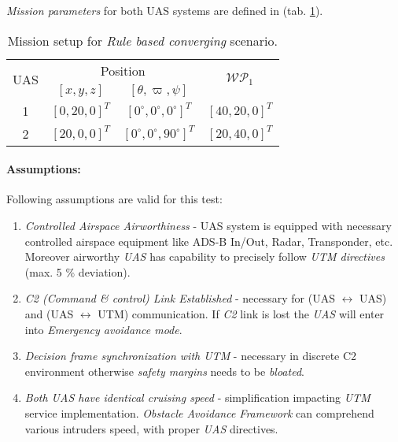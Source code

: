 \noindent\emph{Mission parameters} for both UAS systems are defined in (tab. \ref{tab:missionSetupRuleBasedConvergingScenario}).

\begin{table}[H]
    \centering
    \begin{tabular}{c||c|c||c}
        \multirow{2}{*}{UAS} &\multicolumn{2}{c||}{Position} & \multirow{2}{*}{$\mathscr{WP}_1$} \\\cline{2-3}
          & $[x,y,z]$           & $[\theta,\varpi,\psi]$           & \\\hline\hline
        1 & $[0,20,0]^T $       & $[0^\circ,0^\circ,0^\circ]^T$    & $[40,20,0]^T$\\\hline 
        2 & $[20,0,0]^T $       & $[0^\circ,0^\circ,90^\circ]^T$    & $[20,40,0]^T$\\
    \end{tabular}
    \caption{Mission setup for \emph{Rule based converging} scenario.}
    \label{tab:missionSetupRuleBasedConvergingScenario}
\end{table}


\paragraph{Assumptions:} Following assumptions are valid for this test:

\begin{enumerate}
	\item \emph{Controlled Airspace Airworthiness} - UAS system is equipped with necessary controlled airspace equipment like ADS-B In/Out, Radar, Transponder, etc. Moreover airworthy \emph{UAS} has capability to precisely follow \emph{UTM directives} (max. 5 $\%$ deviation).
	
	\item \emph{C2 (Command \& control) Link Established} - necessary for (UAS $\leftrightarrow$ UAS) and (UAS $\leftrightarrow$ UTM) communication. If \emph{C2} link is lost the \emph{UAS} will enter into \emph{Emergency avoidance mode}.
	
	\item \emph{Decision frame synchronization with UTM} - necessary in discrete C2 environment otherwise \emph{safety margins} needs to be \emph{bloated}.
	
	\item \emph{Both UAS have identical cruising speed} - simplification impacting \emph{UTM} service implementation. \emph{Obstacle Avoidance Framework} can comprehend various intruders speed, with proper \emph{UAS} directives.
\end{enumerate}

